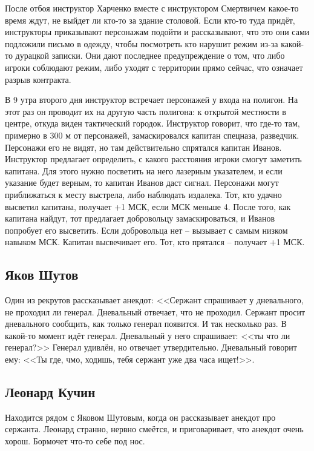 \documentclass{article}
\begin{document}
После отбоя инструктор Харченко вместе с инструктором Смертвичем
какое-то время ждут, не выйдет ли кто-то за здание столовой. Если кто-то
туда придёт, инструкторы приказывают персонажам подойти и рассказывают,
что это они сами подложили письмо в одежду, чтобы посмотреть кто нарушит
режим из-за какой-то дурацкой записки. Они дают последнее предупреждение
о том, что либо игроки соблюдают режим, либо уходят с территории прямо
сейчас, что означает разрыв контракта.

В 9 утра второго дня инструктор встречает персонажей у входа на полигон.
На этот раз он проводит их на другую часть полигона: к открытой
местности в центре, откуда виден тактический городок. Инструктор
говорит, что где-то там, примерно в 300 м от персонажей, замаскировался
капитан спецназа, разведчик. Персонажи его не видят, но там
действительно спрятался капитан Иванов. Инструктор предлагает
определить, с какого расстояния игроки смогут заметить капитана. Для
этого нужно посветить на него лазерным указателем, и если указание будет
верным, то капитан Иванов даст сигнал. Персонажи могут приближаться к
месту выстрела, либо наблюдать издалека. Тот, кто удачно высветил
капитана, получает +1 МСК, если МСК меньше 4. После того, как капитана
найдут, тот предлагает добровольцу замаскироваться, и Иванов попробует
его высветить. Если добровольца нет -- вызывает с самым низком навыком
МСК. Капитан высвечивает его. Тот, кто прятался -- получает +1 МСК.

\subsection{Яков
Шутов}\label{yakov-shutov}

Один из рекрутов рассказывает анекдот: <<Сержант спрашивает у
дневального, не проходил ли генерал. Дневальный отвечает, что не
проходил. Сержант просит дневального сообщить, как только генерал
появится. И так несколько раз. В какой-то момент идёт генерал.
Дневальный у него спрашивает: <<ты что ли генерал?>> Генерал удивлён, но
отвечает утвердительно. Дневальный говорит ему: <<Ты где, чмо, ходишь,
тебя сержант уже два часа ищет!>>.

\subsection{Леонард
Кучин}\label{leonard-kuchin}

Находится рядом с Яковом Шутовым, когда он рассказывает анекдот про
сержанта. Леонард странно, нервно смеётся, и приговаривает, что анекдот
очень хорош. Бормочет что-то себе под нос.
\end{document}
